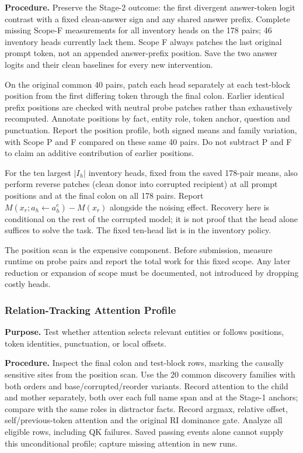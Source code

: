 \documentclass[11pt,a4paper]{article}
\begin{document}
\textbf{Procedure.} Preserve the Stage-2 outcome: the first divergent answer-token
logit contrast with a fixed clean-answer sign and any shared answer prefix.
Complete missing Scope-F measurements for all inventory heads on the 178 pairs;
46 inventory heads currently lack them. Scope F always patches the last original
prompt token, not an appended answer-prefix position. Save the two answer logits
and their clean baselines for every new intervention.

On the original common 40 pairs, patch each head separately at each test-block
position from the first differing token through the final colon. Earlier identical
prefix positions are checked with neutral probe patches rather than exhaustively
recomputed. Annotate positions by fact, entity role, token anchor, question and
punctuation. Report the position profile, both signed means and family variation,
with Scope P and F compared on these same 40 pairs. Do not subtract P and F to
claim an additive contribution of earlier positions.

For the ten largest $|I_h|$ inventory heads, fixed from the saved 178-pair means,
also perform reverse patches (clean donor into corrupted recipient) at all prompt
positions and at the final colon on all 178 pairs. Report
$M(x_r;a_h\leftarrow a_h^c)-M(x_r)$ alongside the noising effect. Recovery here
is conditional on the rest of the corrupted model; it is not proof that the head
alone suffices to solve the task. The fixed ten-head list is in the inventory policy.

The position scan is the expensive component. Before submission, measure runtime
on probe pairs and report the total work for this fixed scope. Any later reduction
or expansion of scope must be documented, not introduced by dropping costly heads.

\subsubsection*{Relation-Tracking Attention Profile}
\textbf{Purpose.} Test whether attention selects relevant entities or follows
positions, token identities, punctuation, or local offsets.

\textbf{Procedure.} Inspect the final colon and test-block rows, marking the
causally sensitive sites from the position scan. Use the 20 common discovery
families with both orders and base/corrupted/reorder variants. Record attention
to the child and mother separately, both over each full name span and at the
Stage-1 anchors; compare with the same roles in distractor facts. Record argmax,
relative offset, self/previous-token attention and the original RI dominance gate.
Analyze all eligible rows, including QK failures. Saved passing events alone
cannot supply this unconditional profile; capture missing attention in new runs.
\end{document}
